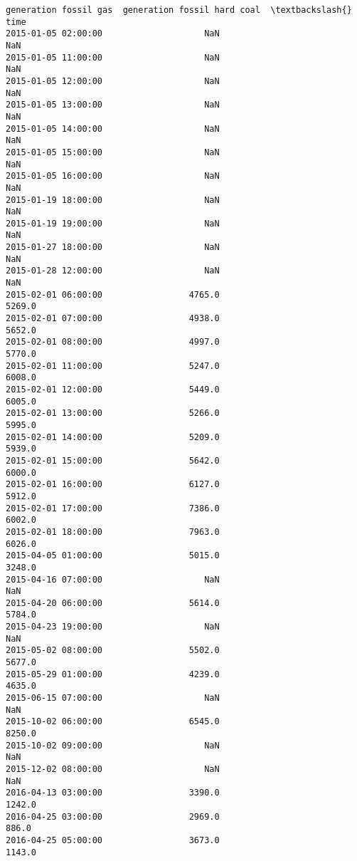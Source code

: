 \documentclass[11pt]{article}
\begin{document}
\begin{tcolorbox}[breakable, size=fbox, boxrule=.5pt, pad at break*=1mm, opacityfill=0]
\begin{Verbatim}[commandchars=\\\{\}]
                     generation fossil gas  generation fossil hard coal  \textbackslash{}
time
2015-01-05 02:00:00                    NaN                          NaN
2015-01-05 11:00:00                    NaN                          NaN
2015-01-05 12:00:00                    NaN                          NaN
2015-01-05 13:00:00                    NaN                          NaN
2015-01-05 14:00:00                    NaN                          NaN
2015-01-05 15:00:00                    NaN                          NaN
2015-01-05 16:00:00                    NaN                          NaN
2015-01-19 18:00:00                    NaN                          NaN
2015-01-19 19:00:00                    NaN                          NaN
2015-01-27 18:00:00                    NaN                          NaN
2015-01-28 12:00:00                    NaN                          NaN
2015-02-01 06:00:00                 4765.0                       5269.0
2015-02-01 07:00:00                 4938.0                       5652.0
2015-02-01 08:00:00                 4997.0                       5770.0
2015-02-01 11:00:00                 5247.0                       6008.0
2015-02-01 12:00:00                 5449.0                       6005.0
2015-02-01 13:00:00                 5266.0                       5995.0
2015-02-01 14:00:00                 5209.0                       5939.0
2015-02-01 15:00:00                 5642.0                       6000.0
2015-02-01 16:00:00                 6127.0                       5912.0
2015-02-01 17:00:00                 7386.0                       6002.0
2015-02-01 18:00:00                 7963.0                       6026.0
2015-04-05 01:00:00                 5015.0                       3248.0
2015-04-16 07:00:00                    NaN                          NaN
2015-04-20 06:00:00                 5614.0                       5784.0
2015-04-23 19:00:00                    NaN                          NaN
2015-05-02 08:00:00                 5502.0                       5677.0
2015-05-29 01:00:00                 4239.0                       4635.0
2015-06-15 07:00:00                    NaN                          NaN
2015-10-02 06:00:00                 6545.0                       8250.0
2015-10-02 09:00:00                    NaN                          NaN
2015-12-02 08:00:00                    NaN                          NaN
2016-04-13 03:00:00                 3390.0                       1242.0
2016-04-25 03:00:00                 2969.0                        886.0
2016-04-25 05:00:00                 3673.0                       1143.0

\end{Verbatim}
\end{tcolorbox}
\end{document}
